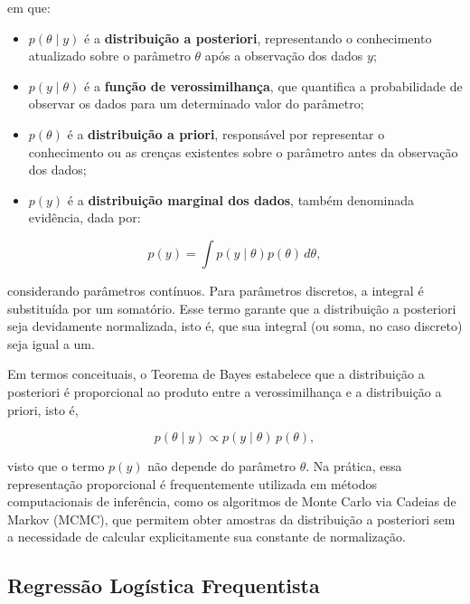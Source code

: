 \documentclass[
  brazilian,
  12pt,
  letterpaper,
  DIV=11,
  numbers=noendperiod]{scrartcl}
\begin{document}
em que:

\begin{itemize}
\item
  \(p(\theta \mid y)\) é a \textbf{distribuição a posteriori},
  representando o conhecimento atualizado sobre o parâmetro \(\theta\)
  após a observação dos dados \(y\);
\item
  \(p(y \mid \theta)\) é a \textbf{função de verossimilhança}, que
  quantifica a probabilidade de observar os dados para um determinado
  valor do parâmetro;
\item
  \(p(\theta)\) é a \textbf{distribuição a priori}, responsável por
  representar o conhecimento ou as crenças existentes sobre o parâmetro
  antes da observação dos dados;
\item
  \(p(y)\) é a \textbf{distribuição marginal dos dados}, também
  denominada evidência, dada por:
\end{itemize}

\begin{equation}
p(y)=\int p(y\mid\theta)p(\theta)\,d\theta,
\label{eq:evidence}
\end{equation}

considerando parâmetros contínuos. Para parâmetros discretos, a integral
é substituída por um somatório. Esse termo garante que a distribuição a
posteriori seja devidamente normalizada, isto é, que sua integral (ou
soma, no caso discreto) seja igual a um.

Em termos conceituais, o Teorema de Bayes estabelece que a distribuição
a posteriori é proporcional ao produto entre a verossimilhança e a
distribuição a priori, isto é,

\begin{equation}
p(\theta \mid y) \propto p(y \mid \theta)\,p(\theta),
\label{eq:posterior_prop}
\end{equation}

visto que o termo \(p(y)\) não depende do parâmetro \(\theta\). Na
prática, essa representação proporcional é frequentemente utilizada em
métodos computacionais de inferência, como os algoritmos de Monte Carlo
via Cadeias de Markov (MCMC), que permitem obter amostras da
distribuição a posteriori sem a necessidade de calcular explicitamente
sua constante de normalização.

\subsection{Regressão Logística
Frequentista}\label{regressuxe3o-loguxedstica-frequentista}
\end{document}
